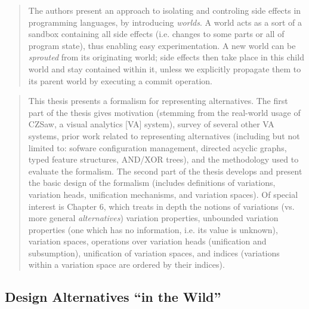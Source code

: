 		\begin{quote}
		\small
		The authors present an approach to isolating and controling side effects in programming languages,
		by introducing {\em worlds}. A world acts as a sort of a sandbox containing all side effects 
		(i.e. changes to some parts or all of program state), thus enabling easy experimentation. 
		A new world can be {\em sprouted} from its originating world; side effects then take place in this
		child world and stay contained within it, unless we explicitly propagate them to its parent world by 
		executing a commit operation.
		\end{quote}
		
		\begin{quote}
		\small
		This thesis presents a formalism for representing alternatives.
		The first part of the thesis gives motivation (stemming from the real-world usage of CZSaw,
		a visual analytics [VA] system), survey of several other VA systems,
		prior work related to representing alternatives (including but not limited to: 
		sofware configuration management, directed acyclic graphs, typed feature structures, AND/XOR trees),
		and the methodology used to evaluate the formalism.
		The second part of the thesis develops and present the basic design of the formalism 
		(includes definitions of variations, variation heads, unification mechanisms, and variation spaces).
		Of special interest is Chapter 6, which treats in depth the notions of 
		variations (vs. more general {\em alternatives})
		variation properties,
		unbounded variation properties (one which has no information, i.e. its value is unknown),
		variation spaces,
		operations over variation heads (unification and subsumption),
		unification of variation spaces, and
		indices (variations within a variation space are ordered by their indices).		
		\end{quote}


\clearpage		
\subsection{Design Alternatives ``in the Wild''}	


